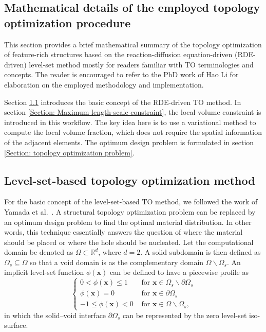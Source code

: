 \begin{subappendices}

\section{Mathematical details of the employed topology optimization procedure}


This section provides a brief mathematical summary of the topology optimization of feature-rich structures based on the reaction-diffusion equation-driven (\gls{RDE}-driven) level-set method mostly for readers familiar with TO terminologies and concepts. The reader is encouraged to refer to the PhD work of Hao Li \cite{Li2022Thesis} for elaboration on the employed methodology and implementation.

Section \ref{Section: level-set-based topology optimization method} introduces the basic concept of the \gls{RDE}-driven \gls{TO} method. In section \ref{Section: Maximum length-scale constraint}, the local volume constraint is introduced in this workflow. The key idea here is to use a variational method to compute the local volume fraction, which does not require the spatial information of the adjacent elements. The optimum design problem is formulated in section \ref{Section: topology optimization problem}.


\subsection{Level-set-based topology optimization method}\label{Section: level-set-based topology optimization method}
For the basic concept of the level-set-based \gls{TO} method, we followed the work of Yamada et al.\ \cite{yamada2010topology}. A structural topology optimization problem can be replaced by an optimum design problem to find the optimal material distribution. In other words, this technique essentially answers the question of where the material should be placed or where the hole should be nucleated. Let the computational domain be denoted as $\Omega \subset \mathbb{R}^d$, where $d=2$. A solid subdomain is then defined as $\Omega_{s} \subseteq \Omega$ so that a void domain is as the complementary domain $\Omega \backslash \Omega_{s}$. An implicit level-set function $\phi \left(\boldsymbol{x}\right)$ can be defined to have a piecewise profile as
\begin{equation}
	\left\{\begin{array}{ll}
		{0<\phi(\boldsymbol{x}) \leq 1} & {\text { for } \boldsymbol{x} \in \Omega_{s} \backslash \partial \Omega_{s}} \\
		{\phi(\boldsymbol{x})=0} & {\text { for } \boldsymbol{x} \in \partial \Omega_{s}} \\
		{-1 \leq \phi(\boldsymbol{x})<0} & {\text { for } \boldsymbol{x} \in \Omega \backslash \Omega_{s}},
	\end{array}\right.
\end{equation}
in which the solid--void interface $\partial \Omega_{s}$ can be represented by the zero level-set iso-surface.  


\end{subappendices}
